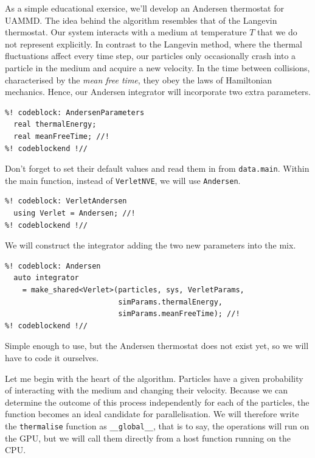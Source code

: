 As a simple educational exersice, we'll develop an Andersen thermostat for 
UAMMD. The idea behind the algorithm resembles that of the Langevin thermostat. 
Our system interacts with a medium at temperature $T$ that we do not represent 
explicitly. In contrast to the Langevin method, where the thermal fluctuations 
affect every time step, our particles only occasionally crash into a particle in 
the medium and acquire a new velocity. In the time between collisions, 
characterised by the \textit{mean free time}, they obey the laws of Hamiltonian 
mechanics. Hence, our Andersen integrator will incorporate two extra parameters. 
\begin{lstlisting}
%! codeblock: AndersenParameters
  real thermalEnergy;
  real meanFreeTime; //!
%! codeblockend !//
\end{lstlisting}
Don't forget to set their default values and read them in from 
\texttt{data.main}. Within the main function, instead of \texttt{VerletNVE}, we 
will use 
\texttt{Andersen}.
\begin{lstlisting}
%! codeblock: VerletAndersen
  using Verlet = Andersen; //!
%! codeblockend !//
\end{lstlisting}
We will construct the integrator adding the two new parameters into the mix.
\begin{lstlisting}
%! codeblock: Andersen
  auto integrator
    = make_shared<Verlet>(particles, sys, VerletParams,
                          simParams.thermalEnergy,
                          simParams.meanFreeTime); //!
%! codeblockend !//
\end{lstlisting}
Simple enough to use, but the Andersen thermostat does not exist yet, so we will 
have to code it ourselves.

Let me begin with the heart of the algorithm. Particles have a given probability 
of interacting with the medium and changing their velocity. Because we can 
determine the outcome of this process independently for each of the particles, 
the function becomes an ideal candidate for parallelisation. We will therefore 
write the \texttt{thermalise} function as \texttt{\_\_global\_\_}, that is to 
say, the operations will run on the GPU, but we will call them directly from a 
host function running on the CPU.

